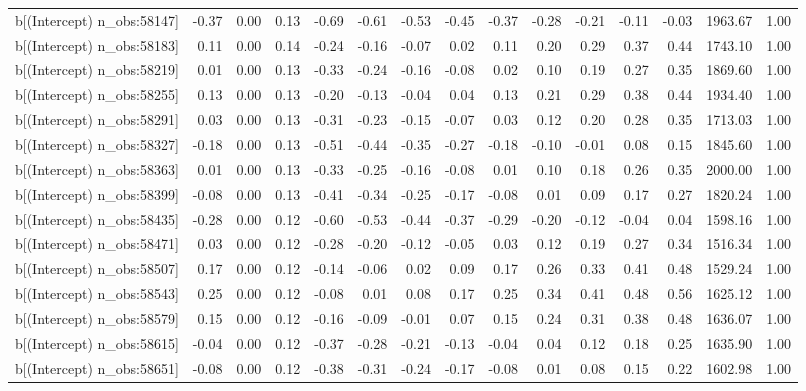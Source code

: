 \begin{table}[ht]
\begin{tabular}{rrrrrrrrrrrrrrr}
  b[(Intercept) n\_obs:58147] & -0.37 & 0.00 & 0.13 & -0.69 & -0.61 & -0.53 & -0.45 & -0.37 & -0.28 & -0.21 & -0.11 & -0.03 & 1963.67 & 1.00 \\ 
  b[(Intercept) n\_obs:58183] & 0.11 & 0.00 & 0.14 & -0.24 & -0.16 & -0.07 & 0.02 & 0.11 & 0.20 & 0.29 & 0.37 & 0.44 & 1743.10 & 1.00 \\ 
  b[(Intercept) n\_obs:58219] & 0.01 & 0.00 & 0.13 & -0.33 & -0.24 & -0.16 & -0.08 & 0.02 & 0.10 & 0.19 & 0.27 & 0.35 & 1869.60 & 1.00 \\ 
  b[(Intercept) n\_obs:58255] & 0.13 & 0.00 & 0.13 & -0.20 & -0.13 & -0.04 & 0.04 & 0.13 & 0.21 & 0.29 & 0.38 & 0.44 & 1934.40 & 1.00 \\ 
  b[(Intercept) n\_obs:58291] & 0.03 & 0.00 & 0.13 & -0.31 & -0.23 & -0.15 & -0.07 & 0.03 & 0.12 & 0.20 & 0.28 & 0.35 & 1713.03 & 1.00 \\ 
  b[(Intercept) n\_obs:58327] & -0.18 & 0.00 & 0.13 & -0.51 & -0.44 & -0.35 & -0.27 & -0.18 & -0.10 & -0.01 & 0.08 & 0.15 & 1845.60 & 1.00 \\ 
  b[(Intercept) n\_obs:58363] & 0.01 & 0.00 & 0.13 & -0.33 & -0.25 & -0.16 & -0.08 & 0.01 & 0.10 & 0.18 & 0.26 & 0.35 & 2000.00 & 1.00 \\ 
  b[(Intercept) n\_obs:58399] & -0.08 & 0.00 & 0.13 & -0.41 & -0.34 & -0.25 & -0.17 & -0.08 & 0.01 & 0.09 & 0.17 & 0.27 & 1820.24 & 1.00 \\ 
  b[(Intercept) n\_obs:58435] & -0.28 & 0.00 & 0.12 & -0.60 & -0.53 & -0.44 & -0.37 & -0.29 & -0.20 & -0.12 & -0.04 & 0.04 & 1598.16 & 1.00 \\ 
  b[(Intercept) n\_obs:58471] & 0.03 & 0.00 & 0.12 & -0.28 & -0.20 & -0.12 & -0.05 & 0.03 & 0.12 & 0.19 & 0.27 & 0.34 & 1516.34 & 1.00 \\ 
  b[(Intercept) n\_obs:58507] & 0.17 & 0.00 & 0.12 & -0.14 & -0.06 & 0.02 & 0.09 & 0.17 & 0.26 & 0.33 & 0.41 & 0.48 & 1529.24 & 1.00 \\ 
  b[(Intercept) n\_obs:58543] & 0.25 & 0.00 & 0.12 & -0.08 & 0.01 & 0.08 & 0.17 & 0.25 & 0.34 & 0.41 & 0.48 & 0.56 & 1625.12 & 1.00 \\ 
  b[(Intercept) n\_obs:58579] & 0.15 & 0.00 & 0.12 & -0.16 & -0.09 & -0.01 & 0.07 & 0.15 & 0.24 & 0.31 & 0.38 & 0.48 & 1636.07 & 1.00 \\ 
  b[(Intercept) n\_obs:58615] & -0.04 & 0.00 & 0.12 & -0.37 & -0.28 & -0.21 & -0.13 & -0.04 & 0.04 & 0.12 & 0.18 & 0.25 & 1635.90 & 1.00 \\ 
  b[(Intercept) n\_obs:58651] & -0.08 & 0.00 & 0.12 & -0.38 & -0.31 & -0.24 & -0.17 & -0.08 & 0.01 & 0.08 & 0.15 & 0.22 & 1602.98 & 1.00 \\ 

\end{tabular}
\end{table}
